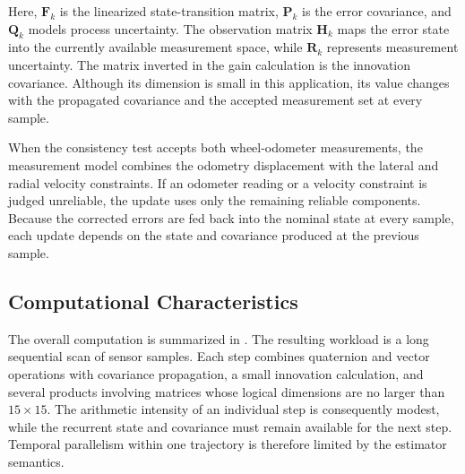 Here, $\mathbf{F}_k$ is the linearized state-transition matrix, $\mathbf{P}_k$ is the error covariance, and $\mathbf{Q}_k$ models process uncertainty. The observation matrix $\mathbf{H}_k$ maps the error state into the currently available measurement space, while $\mathbf{R}_k$ represents measurement uncertainty. The matrix inverted in the gain calculation is the innovation covariance. Although its dimension is small in this application, its value changes with the propagated covariance and the accepted measurement set at every sample.

When the consistency test accepts both wheel-odometer measurements, the measurement model combines the odometry displacement with the lateral and radial velocity constraints. If an odometer reading or a velocity constraint is judged unreliable, the update uses only the remaining reliable components. Because the corrected errors are fed back into the nominal state at every sample, each update depends on the state and covariance produced at the previous sample.

\subsection{Computational Characteristics}
\label{subsec:workload-characteristics}

The overall computation is summarized in . The resulting workload is a long sequential scan of sensor samples. Each step combines quaternion and vector operations with covariance propagation, a small innovation calculation, and several products involving matrices whose logical dimensions are no larger than $15\times15$. The arithmetic intensity of an individual step is consequently modest, while the recurrent state and covariance must remain available for the next step. Temporal parallelism within one trajectory is therefore limited by the estimator semantics.

